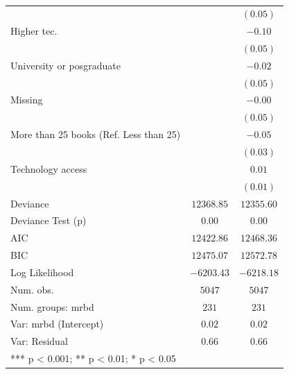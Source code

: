 \documentclass[
  letterpaper,
  DIV=11,
  numbers=noendperiod]{scrartcl}
\begin{document}
\begin{table}
{\begin{center}
\begin{tabular}{l c c}
                                             &               & $(0.05)$      \\
\quad Higher tec.                            &               & $-0.10$       \\
                                             &               & $(0.05)$      \\
\quad University or posgraduate              &               & $-0.02$       \\
                                             &               & $(0.05)$      \\
\quad Missing                                &               & $-0.00$       \\
                                             &               & $(0.05)$      \\
More than 25 books (Ref. Less than 25)       &               & $-0.05$       \\
                                             &               & $(0.03)$      \\
Technology access                            &               & $0.01$        \\
                                             &               & $(0.01)$      \\
\hline
Deviance                                     & $12368.85$    & $12355.60$    \\
Deviance Test (p)                            & $0.00$        & $0.00$        \\
AIC                                          & $12422.86$    & $12468.36$    \\
BIC                                          & $12475.07$    & $12572.78$    \\
Log Likelihood                               & $-6203.43$    & $-6218.18$    \\
Num. obs.                                    & $5047$        & $5047$        \\
Num. groups: mrbd                            & $231$         & $231$         \\
Var: mrbd (Intercept)                        & $0.02$        & $0.02$        \\
Var: Residual                                & $0.66$        & $0.66$        \\
\hline
\multicolumn{3}{l}{\scriptsize{*** p < 0.001; ** p < 0.01; * p < 0.05}}
\end{tabular}
\caption{}
\label{table:coefficients}
\end{center}

}

\end{table}%
\end{document}
